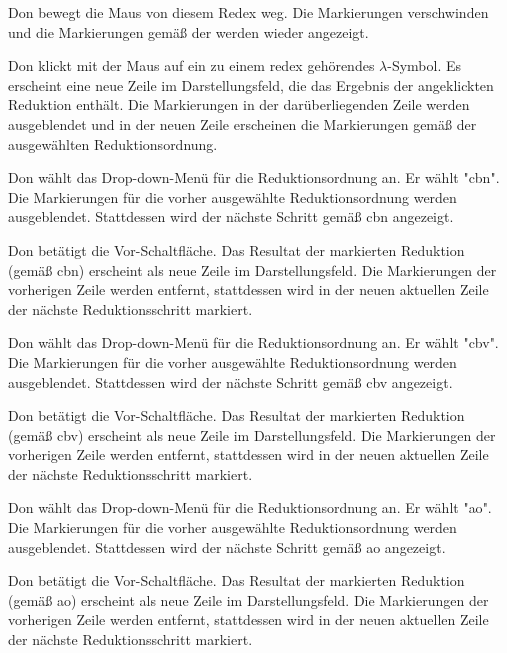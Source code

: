 \documentclass[parskip=full,11pt,twoside]{scrartcl}
\begin{document}
{Don bewegt die Maus von diesem Redex weg.}
{Die Markierungen verschwinden und die Markierungen gemäß der 
werden wieder angezeigt.}

{Don klickt mit der Maus auf ein zu einem \gls{redex} gehörendes $\lambda$-Symbol.}
{Es erscheint eine neue Zeile im Darstellungsfeld, die das Ergebnis der angeklickten
Reduktion enthält. Die Markierungen in der darüberliegenden Zeile werden ausgeblendet
und in der neuen Zeile erscheinen die Markierungen gemäß der ausgewählten
Reduktionsordnung.}

{Don wählt das Drop-down-Menü für die Reduktionsordnung an. Er wählt "\gls{cbn}".}
{Die Markierungen für die vorher ausgewählte Reduktionsordnung werden ausgeblendet.
Stattdessen wird der nächste Schritt gemäß \gls{cbn} angezeigt.}

{Don betätigt die Vor-Schaltfläche.}
{Das Resultat der markierten Reduktion (gemäß \gls{cbn}) erscheint als neue Zeile im Darstellungsfeld.
Die Markierungen der vorherigen Zeile werden entfernt, stattdessen wird in der neuen
aktuellen Zeile der nächste Reduktionsschritt markiert.}

{Don wählt das Drop-down-Menü für die Reduktionsordnung an. Er wählt "\gls{cbv}".}
{Die Markierungen für die vorher ausgewählte Reduktionsordnung werden ausgeblendet.
Stattdessen wird der nächste Schritt gemäß \gls{cbv} angezeigt.}

{Don betätigt die Vor-Schaltfläche.}
{Das Resultat der markierten Reduktion (gemäß \gls{cbv}) erscheint als neue Zeile im Darstellungsfeld.
Die Markierungen der vorherigen Zeile werden entfernt, stattdessen wird in der neuen
aktuellen Zeile der nächste Reduktionsschritt markiert.}

{Don wählt das Drop-down-Menü für die Reduktionsordnung an. Er wählt "\gls{ao}".}
{Die Markierungen für die vorher ausgewählte Reduktionsordnung werden ausgeblendet.
Stattdessen wird der nächste Schritt gemäß \gls{ao} angezeigt.}

{Don betätigt die Vor-Schaltfläche.}
{Das Resultat der markierten Reduktion (gemäß \gls{ao}) erscheint als neue Zeile im Darstellungsfeld.
Die Markierungen der vorherigen Zeile werden entfernt, stattdessen wird in der neuen
aktuellen Zeile der nächste Reduktionsschritt markiert.}
\end{document}
